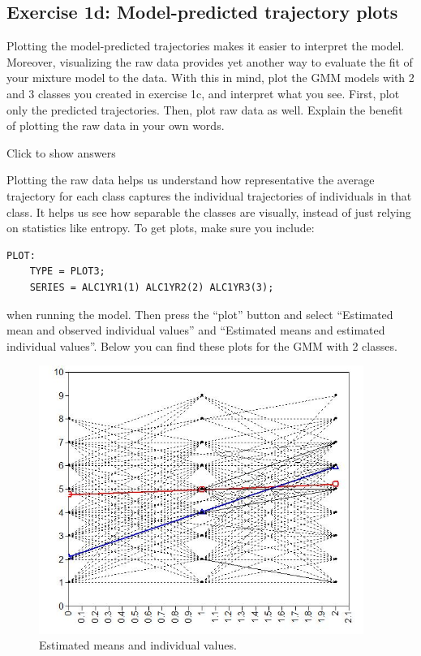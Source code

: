 \documentclass[
]{book}
\begin{document}
\hypertarget{exercise-1d-model-predicted-trajectory-plots}{%
\subsection{Exercise 1d: Model-predicted trajectory plots}\label{exercise-1d-model-predicted-trajectory-plots}}

Plotting the model-predicted trajectories makes it easier to interpret the model. Moreover, visualizing the raw data provides yet another way to evaluate the fit of your mixture model to the data. With this in mind, plot the GMM models with 2 and 3 classes you created in exercise 1c, and interpret what you see. First, plot only the predicted trajectories. Then, plot raw data as well. Explain the benefit of plotting the raw data in your own words.

Click to show answers

Plotting the raw data helps us understand how representative the average trajectory for each class captures the individual trajectories of individuals in that class. It helps us see how separable the classes are visually, instead of just relying on statistics like entropy. To get plots, make sure you include:

\begin{verbatim}
PLOT:
    TYPE = PLOT3;
    SERIES = ALC1YR1(1) ALC1YR2(2) ALC1YR3(3);
\end{verbatim}

when running the model. Then press the ``plot'' button and select ``Estimated mean and observed individual values'' and ``Estimated means and estimated individual values''. Below you can find these plots for the GMM with 2 classes.

\begin{figure}
\centering
\includegraphics[width=4.16667in,height=\textheight]{./figures/exercise1D-estimatedMeansIndividualValues.jpg}
\caption{Estimated means and individual values.}
\end{figure}
\end{document}
